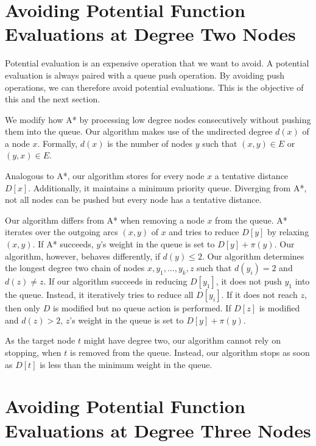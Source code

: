 \documentclass[a4paper,UKenglish,cleveref, autoref]{lipics-v2019}
\begin{document}
\section{Avoiding Potential Function Evaluations at Degree Two Nodes}

Potential evaluation is an expensive operation that we want to avoid.
A potential evaluation is always paired with a queue push operation.
By avoiding push operations, we can therefore avoid potential evaluations.
This is the objective of this and the next section.

We modify how A* by processing low degree nodes consecutively without pushing them into the queue.
Our algorithm makes use of the undirected degree $d(x)$ of a node $x$. 
Formally, $d(x)$ is the number of nodes $y$ such that $(x,y)\in E$ or $(y,x)\in E$.

Analogous to A*, our algorithm stores for every node $x$ a tentative distance $D[x]$.
Additionally, it maintains a minimum priority queue. 
Diverging from A*, not all nodes can be pushed but every node has a tentative distance.

Our algorithm differs from A* when removing a node $x$ from the queue.
A* iterates over the outgoing arcs $(x,y)$ of $x$ and tries to reduce $D[y]$ by relaxing $(x,y)$.
If A* succeeds, $y$'s weight in the queue is set to $D[y]+\pi(y)$.
Our algorithm, however, behaves differently, if $d(y)\le 2$.
Our algorithm determines the longest degree two chain of nodes $x,y_1,\ldots, y_k, z$ such that $d(y_i)=2$ and $d(z)\neq z$.
If our algorithm succeeds in reducing $D[y_1]$, it does not push $y_1$ into the queue.
Instead, it iteratively tries to reduce all $D[y_i]$.
If it does not reach $z$, then only $D$ is modified but no queue action is performed.
If $D[z]$ is modified and $d(z)>2$, $z$'s weight in the queue is set to $D[y]+\pi(y)$.

As the target node $t$ might have degree two, our algorithm cannot rely on stopping, when $t$ is removed from the queue.
Instead, our algorithm stops as soon as $D[t]$ is less than the minimum weight in the queue.

\section{Avoiding Potential Function Evaluations at Degree Three Nodes}
\end{document}

